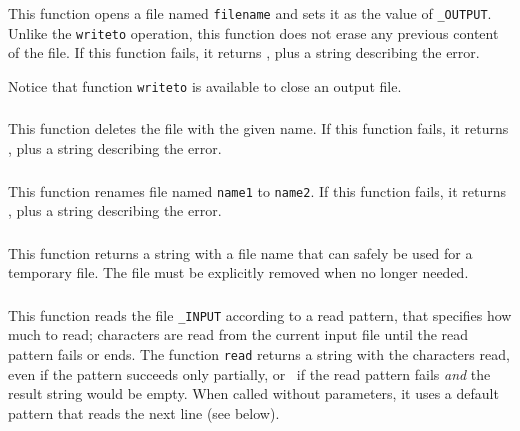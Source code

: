 \subsubsection*{\ff {}}

This function opens a file named \verb|filename| and sets it as the
value of \verb|_OUTPUT|.
Unlike the \verb|writeto| operation,
this function does not erase any previous content of the file.
If this function fails, it returns \nil,
plus a string describing the error.

Notice that function \verb|writeto| is available to close an output file.

\subsubsection*{\ff {}}

This function deletes the file with the given name.
If this function fails, it returns \nil,
plus a string describing the error.

\subsubsection*{\ff {}}

This function renames file named \verb|name1| to \verb|name2|.
If this function fails, it returns \nil,
plus a string describing the error.

\subsubsection*{\ff {}}

This function returns a string with a file name that can safely
be used for a temporary file.
The file must be explicitly removed when no longer needed.

\subsubsection*{\ff {}}

This function reads the file \verb|_INPUT|
according to a read pattern, that specifies how much to read;
characters are read from the current input file until
the read pattern fails or ends.
The function \verb|read| returns a string with the characters read,
even if the pattern succeeds only partially,
or \nil\ if the read pattern fails \emph{and}
the result string would be empty.
When called without parameters,
it uses a default pattern that reads the next line
(see below).

